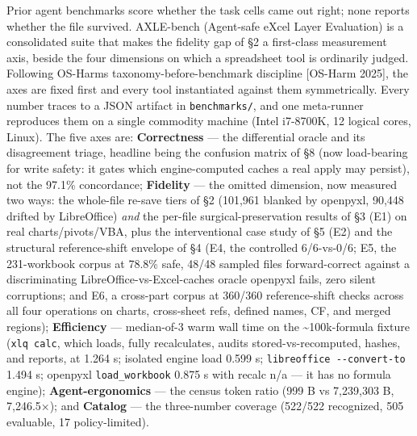 \documentclass[
]{article}
\newcounter{none} %
\begin{document}
Prior agent benchmarks score whether the task cells came out right; none
reports whether the file survived. AXLE-bench (Agent-safe eXcel Layer
Evaluation) is a consolidated suite that makes the fidelity gap of §2 a
first-class measurement axis, beside the four dimensions on which a
spreadsheet tool is ordinarily judged. Following
OS-Harm\textquotesingle s taxonomy-before-benchmark discipline
{[}OS-Harm 2025{]}, the axes are fixed first and every tool instantiated
against them symmetrically. Every number traces to a JSON artifact in
\texttt{benchmarks/}, and one meta-runner reproduces them on a single
commodity machine (Intel i7-8700K, 12 logical cores, Linux). The five
axes are: \textbf{Correctness} --- the differential oracle and its
disagreement triage, headline being the confusion matrix of §8 (now
load-bearing for write safety: it gates which engine-computed caches a
real apply may persist), not the 97.1\% concordance; \textbf{Fidelity}
--- the omitted dimension, now measured two ways: the whole-file re-save
tiers of §2 (101,961 blanked by openpyxl, 90,448 drifted by LibreOffice)
\emph{and} the per-file surgical-preservation results of §3 (E1) on real
charts/pivots/VBA, plus the interventional case study of §5 (E2) and the
structural reference-shift envelope of §4 (E4, the controlled
6/6-vs-0/6; E5, the 231-workbook corpus at 78.8\% safe, 48/48 sampled
files forward-correct against a discriminating
LibreOffice-vs-Excel-caches oracle openpyxl fails, zero silent
corruptions; and E6, a cross-part corpus at 360/360 reference-shift
checks across all four operations on charts, cross-sheet refs, defined
names, CF, and merged regions); \textbf{Efficiency} --- median-of-3 warm
wall time on the \textasciitilde100k-formula fixture
(\texttt{xlq\ calc}, which loads, fully recalculates, audits
stored-vs-recomputed, hashes, and reports, at 1.264 s; isolated engine
load 0.599 s; \texttt{libreoffice\ -\/-convert-to} 1.494 s; openpyxl
\texttt{load\_workbook} 0.875 s with recalc n/a --- it has no formula
engine); \textbf{Agent-ergonomics} --- the census token ratio (999 B vs
7,239,303 B, 7,246.5×); and \textbf{Catalog} --- the three-number
coverage (522/522 recognized, 505 evaluable, 17 policy-limited).
\end{document}
